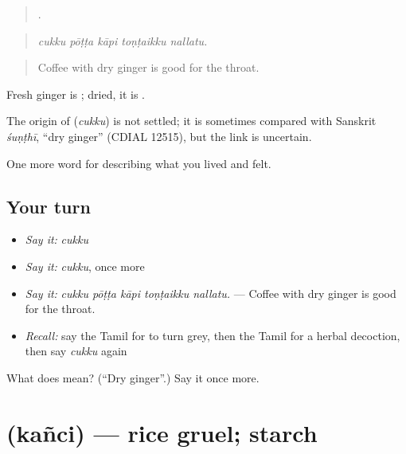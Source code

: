 \begin{quote}
    .
\end{quote}

\begin{quote}
\emph{cukku pōṭṭa kāpi toṇṭaikku nallatu.}
\end{quote}

\begin{quote}
Coffee with dry ginger is good for the throat.
\end{quote}

Fresh ginger is ; dried, it is .

\begin{cousinweb}
The origin of \textbf{} (\emph{cukku}) is not settled; it is sometimes compared with Sanskrit \emph{śuṇṭhī}, \textquotedblleft{}dry ginger\textquotedblright{} (CDIAL 12515), but the link is uncertain.
\end{cousinweb}

\begin{grammarlens}[title={What you've built}]
One more word for describing what you lived and felt.
\end{grammarlens}

\subsection*{Your turn}
\begin{itemize}
\raggedright
  \item \emph{Say it:} \emph{cukku}
  \item \emph{Say it:} \emph{cukku}, once more
  \item \emph{Say it:} \emph{cukku pōṭṭa kāpi toṇṭaikku nallatu.} — Coffee with dry ginger is good for the throat.
  \item \emph{Recall:} say the Tamil for to turn grey, then the Tamil for a herbal decoction, then say \emph{cukku} again
\end{itemize}

\begin{tcolorbox}[breakable,colback=teal!4,colframe=teal!35!black,title={Before you move on}]
What does  mean? (\textquotedblleft{}Dry ginger\textquotedblright{}.) Say it once more.
\end{tcolorbox}
\section[\texorpdfstring{\ta{கஞ்சி} (kañci)}{கஞ்சி (kañci)}]{ (kañci) — rice gruel; starch}

